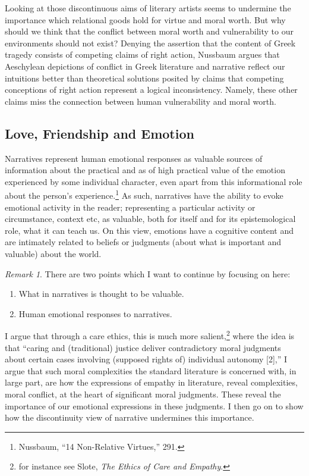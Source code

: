 \documentclass[phdthesis,12pt,final]{wuthesis}
\theoremstyle{definition}
\theoremstyle{definition}
\theoremstyle{definition}
\theoremstyle{definition}
\theoremstyle{remark}
\newtheorem*{remark}{Remark}
\begin{document}
Looking at those discontinuous aims of literary artists seems to undermine the importance which relational goods hold for virtue and moral worth. But why should we think that the conflict between moral worth and vulnerability to our environments should not exist? Denying the assertion that the content of Greek tragedy consists of competing claims of right action, Nussbaum argues that Aeschylean depictions of conflict in Greek literature and narrative reflect our intuitions better than theoretical solutions posited by claims that competing conceptions of right action represent a logical inconsistency. Namely, these other claims miss the connection between human vulnerability and moral worth.

\subsection*{Love, Friendship and Emotion}\label{love-friendship-and-emotion}

Narratives represent human emotional responses as valuable sources of information about the practical and as of high practical value of the emotion experienced by some individual character, even apart from this informational role about the person's experience.\footnote{Nussbaum, {``14 {Non-Relative Virtues},''} 291.} As such, narratives have the ability to evoke emotional activity in the reader; representing a particular activity or circumstance, context etc, as valuable, both for itself and for its epistemological role, what it can teach us. On this view, emotions have a cognitive content and are intimately related to beliefs or judgments (about what is important and valuable) about the world.

\begin{remark}

\noindent There are two points which I want to continue by focusing on here:

\begin{enumerate}
\def\labelenumi{\arabic{enumi}.}
\tightlist
\item
  What in narratives is thought to be valuable.
\item
  Human emotional responses to narratives.
\end{enumerate}

\end{remark}

I argue that through a care ethics, this is much more salient,\footnote{for instance see Slote, \emph{The {Ethics} of {Care} and {Empathy}}.} where the idea is that ``caring and (traditional) justice deliver contradictory moral judgments about certain cases involving (supposed rights of) individual autonomy {[}2{]},'' I argue that such moral complexities the standard literature is concerned with, in large part, are how the expressions of empathy in literature, reveal complexities, moral conflict, at the heart of significant moral judgments. These reveal the importance of our emotional expressions in these judgments. I then go on to show how the discontinuity view of narrative undermines this importance.
\end{document}
